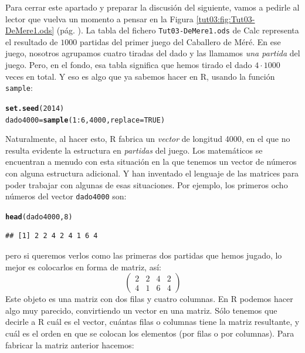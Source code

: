 \documentclass[10pt,a4paper]{article}\usepackage[]{graphicx}\usepackage[]{color}
\makeatletter
\newcommand{\hlnum}[1]{\textcolor[rgb]{0.686,0.059,0.569}{#1}}%
\newcommand{\hlopt}[1]{\textcolor[rgb]{0,0,0}{#1}}%
\newcommand{\hlstd}[1]{\textcolor[rgb]{0.345,0.345,0.345}{#1}}%
\newcommand{\hlkwb}[1]{\textcolor[rgb]{0.69,0.353,0.396}{#1}}%
\newcommand{\hlkwc}[1]{\textcolor[rgb]{0.333,0.667,0.333}{#1}}%
\newcommand{\hlkwd}[1]{\textcolor[rgb]{0.737,0.353,0.396}{\textbf{#1}}}%
\newenvironment{kframe}{%
 \def\at@end@of@kframe{}%
 \ifinner\ifhmode%
  \def\at@end@of@kframe{\end{minipage}}%
  \begin{minipage}{\columnwidth}%
 \fi\fi%
 \def\FrameCommand##1{\hskip\@totalleftmargin \hskip-\fboxsep
 \colorbox{shadecolor}{##1}\hskip-\fboxsep
     \hskip-\linewidth \hskip-\@totalleftmargin \hskip\columnwidth}%
 \MakeFramed {\advance\hsize-\width
   \@totalleftmargin\z@ \linewidth\hsize
   \@setminipage}}%
 {\par\unskip\endMakeFramed%
 \at@end@of@kframe}
\newenvironment{knitrout}{}{} %
\makeatother
\begin{document}
Para cerrar este apartado y preparar la discusión del siguiente, vamos a pedirle al lector que vuelva un momento a pensar en la Figura \ref{tut03:fig:Tut03-DeMere1.ods} (pág. \pageref{tut03:fig:Tut03-DeMere1.ods}). La tabla del fichero {\tt Tut03-DeMere1.ods} de Calc representa el resultado de $1000$ partidas del primer juego del Caballero de Méré. En ese juego, nosotros agrupamos cuatro tiradas del dado y las llamamos {\em una partida} del juego. Pero, en el fondo, esa tabla significa que hemos tirado el dado $4\cdot 1000$ veces en total. Y eso es algo que ya sabemos hacer en R, usando la función {\tt sample}:
\begin{knitrout}
\color{fgcolor}\begin{kframe}
\begin{alltt}
\hlkwd{set.seed}\hlstd{(}\hlnum{2014}\hlstd{)}
\hlstd{dado4000} \hlkwb{=} \hlkwd{sample}\hlstd{(}\hlnum{1}\hlopt{:}\hlnum{6}\hlstd{,} \hlnum{4000}\hlstd{,} \hlkwc{replace}\hlstd{=}\hlnum{TRUE}\hlstd{)}
\end{alltt}
\end{kframe}
\end{knitrout}
Naturalmente, al hacer esto, R fabrica un {\em vector} de longitud 4000, en el que no resulta evidente la estructura en {\em partidas} del juego. Los matemáticos se encuentran a menudo con esta situación en la que tenemos un vector de números con alguna estructura adicional. Y han inventado el lenguaje de las matrices para poder trabajar con algunas de esas situaciones. Por ejemplo,
los primeros ocho números del vector {\tt dado4000} son:
\begin{knitrout}
\color{fgcolor}\begin{kframe}
\begin{alltt}
\hlkwd{head}\hlstd{(dado4000,} \hlnum{8}\hlstd{)}
\end{alltt}
\begin{verbatim}
## [1] 2 2 4 2 4 1 6 4
\end{verbatim}
\end{kframe}
\end{knitrout}
pero si queremos verlos como las primeras dos partidas que hemos jugado, lo mejor es colocarlos en forma de matriz, así:
\[
\left(
\begin{array}{cccc}
2& 2& 4& 2\\
4& 1& 6& 4
\end{array}
\right)
\]
Este objeto es una matriz con dos filas y cuatro columnas. En R podemos hacer algo muy parecido, convirtiendo un vector en una matriz. Sólo tenemos que decirle a R cuál es el vector, cuántas filas o columnas tiene la matriz resultante, y cuál es el orden en que se colocan los elementos (por filas o por columnas). Para fabricar la matriz anterior hacemos:
\end{document}
